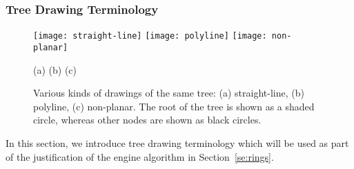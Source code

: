 \documentclass[10pt,psfig]{article}
\begin{document}
{\subsubsection{Tree Drawing Terminology}

\begin{figure}[t]
\centerline{
\hspace{0.75in}
{\texttt{[image: straight-line]}}
{\texttt{[image: polyline]}}
\hspace{0.5cm}
{\texttt{[image: non-planar]}}\\
}
\hspace{4.75cm} (a)
\hspace{3.5cm} (b)
\hspace{2.6cm} (c)

\caption{Various kinds of drawings of the same tree: (a)
straight-line, (b) polyline, (c) non-planar.
The root of the tree is shown as a shaded circle, whereas
other nodes are shown as black circles.}
\label{fi:tree_examples}
\end{figure}

In this section, we introduce tree drawing terminology which will be used as part of the justification of the engine algorithm in Section~\ref{se:rings}.

}
\end{document}
